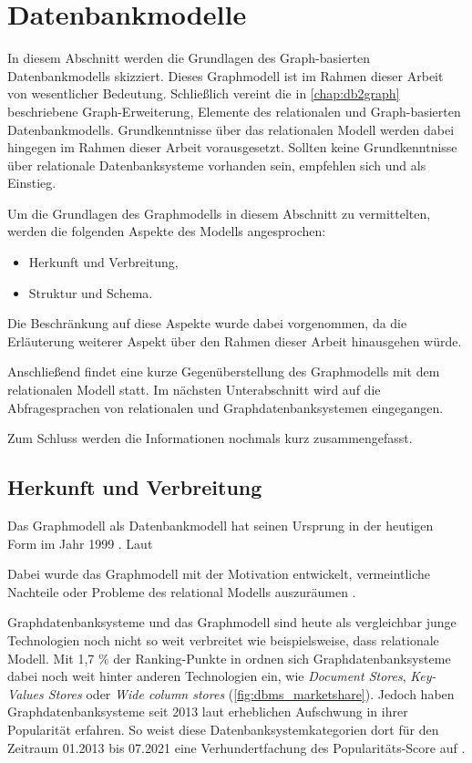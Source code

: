 \section{Datenbankmodelle}
\label{datenmodelle}
In diesem Abschnitt werden die Grundlagen des Graph-basierten Datenbankmodells skizziert. Dieses Graphmodell ist im Rahmen dieser Arbeit von wesentlicher Bedeutung. Schließlich vereint die in \autoref{chap:db2graph} beschriebene Graph-Erweiterung, Elemente des relationalen und Graph-basierten Datenbankmodells. Grundkenntnisse über das relationalen Modell werden dabei hingegen im Rahmen dieser Arbeit vorausgesetzt. Sollten keine Grundkenntnisse über relationale Datenbanksysteme vorhanden sein, empfehlen sich \cite{rdbms_book} und \cite{codd_relational_model} als Einstieg.

Um die Grundlagen des Graphmodells in diesem Abschnitt zu vermittelten, werden die folgenden Aspekte des Modells angesprochen:
\begin{itemize}
    \item Herkunft und Verbreitung,
    \item Struktur und Schema.
\end{itemize}
Die Beschränkung auf diese Aspekte wurde dabei vorgenommen, da die Erläuterung weiterer Aspekt über den Rahmen dieser Arbeit hinausgehen würde. 

Anschließend findet eine kurze Gegenüberstellung des Graphmodells mit dem relationalen Modell statt. Im nächsten Unterabschnitt wird auf die Abfragesprachen von relationalen und Graphdatenbanksystemen eingegangen.

Zum Schluss werden die Informationen nochmals kurz zusammengefasst. 

\subsection{Herkunft und Verbreitung}
Das Graphmodell als Datenbankmodell hat seinen Ursprung in der heutigen Form im Jahr 1999 \cite{gdbms}. Laut 

Dabei wurde das Graphmodell mit der Motivation entwickelt, vermeintliche Nachteile oder Probleme des relational Modells auszuräumen \cite{gdbms}.

Graphdatenbanksysteme und das Graphmodell sind heute als vergleichbar junge Technologien noch nicht so weit verbreitet wie beispielsweise, dass relationale Modell. Mit 1,7 \% der Ranking-Punkte in \cite{db_engines_ranking_july} ordnen sich Graphdatenbanksysteme dabei noch weit hinter anderen Technologien ein, wie \textit{Document Stores}, \textit{Key-Values Stores} oder \textit{Wide column stores} \cite{db_engines_ranking_july} (\autoref{fig:dbms_marketshare}). Jedoch haben Graphdatenbanksysteme seit 2013 laut \cite{db_engines_ranking_july} erheblichen Aufschwung in ihrer Popularität erfahren. So weist diese Datenbanksystemkategorien dort für den Zeitraum 01.2013 bis 07.2021 eine Verhundertfachung des Popularitäts-Score auf \cite{db_engines_ranking_july}. 

